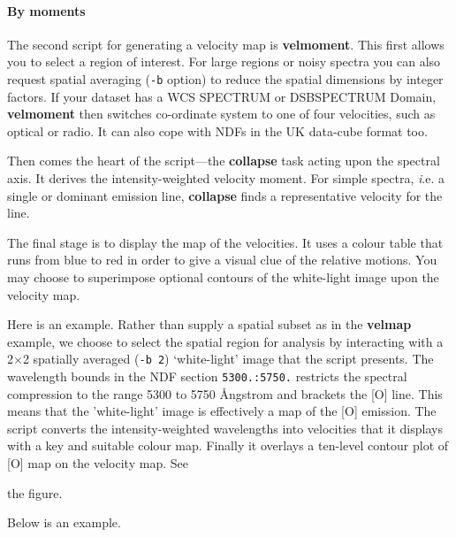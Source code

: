 \documentclass[twoside,11pt]{article}
\newcommand{\htmlref}[2]{#1}
\newcommand{\xref}[3]{#1}
\newcommand{\xlabel}[1]{}
\begin{document}
{\paragraph{\label{sc16_velmoment}\latexonly{\vspace*{0.8em}}By
moments\latexonly{\newline}\xlabel{sc16_velmoment}}

\hspace*{-2.1ex}The second script for generating a velocity map is \xref{{\bf
velmoment}}{sun237}{velmoment}.  This first allows you to select a
region of interest.  For large regions or noisy spectra you can also
request spatial averaging ({\tt -b} option) to reduce the spatial
dimensions by integer factors.  If your dataset has a WCS
\xref{SPECTRUM or DSBSPECTRUM Domain}{sun95}{se_domains}, {\bf velmoment}
then switches co-ordinate system to one of four velocities, such as
optical or radio.  It can also cope with NDFs in the
\htmlref{UK data-cube format}{sc16_teifufile} too.

Then comes the heart of the script---the 
\xref{{\bf collapse}}{sun237}{COLLAPSE} task acting upon the spectral
axis.  It derives the intensity-weighted velocity moment.  For simple
spectra, {\emph i.e.} a single or dominant emission line, {\bf
collapse} finds a representative velocity for the line.

The final stage is to display the map of the velocities.  It uses a
colour table that runs from blue to red in order to give a visual clue
of the relative motions.  You may choose to superimpose optional
contours of the white-light image upon the velocity map.

Here is an example.  Rather than supply a spatial subset as in the
{\bf velmap} example, we choose to select the spatial region for
analysis by interacting with a 2$\times$2 spatially averaged ({\tt -b
2}) `white-light' image that the script presents.  The wavelength
bounds in the NDF section {\tt 5300.:5750.} restricts the spectral
compression to the range 5300 to 5750 {\AA}ngstrom and brackets the
[O{}] line.  This means that the 'white-light' image is
effectively a map of the [O{}] emission.  The script converts the
intensity-weighted wavelengths into velocities that it displays with a
key and suitable colour map.  Finally it overlays a ten-level contour
plot of [O{}] map on the velocity map.  See
\begin{htmlonly}
the figure.
\end{htmlonly}
  Below is an
example.

}
\end{document}
